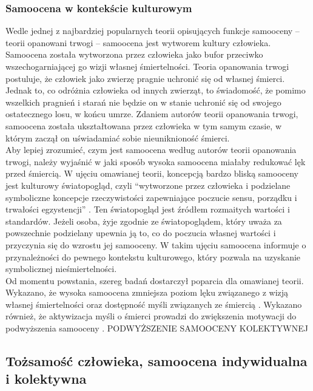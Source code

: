 \documentclass[man]{apa6}
\begin{document}
\subsubsection{Samoocena w kontekście kulturowym}

Wedle jednej z najbardziej popularnych teorii opisujących funkcje samooceny -- teorii opanowani trwogi \parencite{pyszczynski2004people} -- samoocena jest wytworem kultury człowieka. Samoocena została wytworzona przez człowieka jako bufor przeciwko wszechogarniającej go wizji własnej śmiertelności. Teoria opanowania trwogi postuluje, że człowiek jako zwierzę pragnie uchronić się od własnej śmierci. Jednak to, co odróżnia człowieka od innych zwierząt, to świadomość, że pomimo wszelkich pragnień i starań nie będzie on w stanie uchronić się od swojego ostatecznego losu, w końcu umrze. Zdaniem autorów teorii opanowania trwogi, samoocena została ukształtowana przez człowieka w tym samym czasie, w którym zaczął on uświadamiać sobie nieuniknioność śmierci.\\

Aby lepiej zrozumieć, czym jest samoocena według autorów teorii opanowania trwogi, należy wyjaśnić w jaki sposób wysoka samoocena miałaby redukować lęk przed śmiercią. W ujęciu omawianej teorii, koncepcją bardzo bliską samooceny jest kulturowy światopogląd, czyli ``wytworzone przez człowieka i podzielane symboliczne koncepcje rzeczywistości zapewniające poczucie sensu, porządku i trwałości egzystencji'' \parencite[][, s. 436]{pyszczynski2004people}. Ten światopogląd jest źródłem rozmaitych wartości i standardów. Jeżeli osoba, żyje zgodnie ze światopoglądem, który uważa za powszechnie podzielany upewnia ją to, co do poczucia własnej wartości i przyczynia się do wzrostu jej samooceny. W takim ujęciu samoocena informuje o przynależności do pewnego kontekstu kulturowego, który pozwala na uzyskanie symbolicznej nieśmiertelności.\\

Od momentu powstania, szereg badań dostarczył poparcia dla omawianej teorii. Wykazano, że wysoka samoocena zmniejsza poziom lęku związanego z wizją własnej śmiertelności \parencite{greenberg1992people} oraz dostępność myśli związanych ze śmiercią \parencite{harmon1997terror}. Wykazano również, że aktywizacja myśli o śmierci prowadzi do zwiększenia motywacji do podwyższenia samooceny \parencite{greenberg1992people}. PODWYŻSZENIE SAMOOCENY KOLEKTYWNEJ  

\newpage

\subsection{Tożsamość człowieka, samoocena indywidualna i kolektywna}
\end{document}
